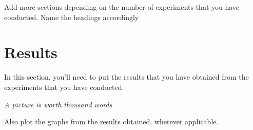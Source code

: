 \documentclass[11pt,swedish, openany]{book}
\begin{document}
Add more sections depending on the number of experiments that you have 
conducted. Name the headings accordingly

\chapter {Results}
In this section, you'll need to put the results that you have obtained from the experiments that you have conducted.

\begin{center}
        \emph{A picture is worth thousand words}
\end{center}

Also plot the graphs from the results obtained, wherever applicable.



\pagebreak




\end{document}

